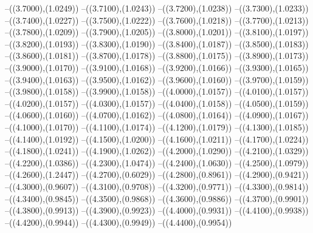 {	--({\sx*(3.7000)},{\sy*(1.0249)})
	--({\sx*(3.7100)},{\sy*(1.0243)})
	--({\sx*(3.7200)},{\sy*(1.0238)})
	--({\sx*(3.7300)},{\sy*(1.0233)})
	--({\sx*(3.7400)},{\sy*(1.0227)})
	--({\sx*(3.7500)},{\sy*(1.0222)})
	--({\sx*(3.7600)},{\sy*(1.0218)})
	--({\sx*(3.7700)},{\sy*(1.0213)})
	--({\sx*(3.7800)},{\sy*(1.0209)})
	--({\sx*(3.7900)},{\sy*(1.0205)})
	--({\sx*(3.8000)},{\sy*(1.0201)})
	--({\sx*(3.8100)},{\sy*(1.0197)})
	--({\sx*(3.8200)},{\sy*(1.0193)})
	--({\sx*(3.8300)},{\sy*(1.0190)})
	--({\sx*(3.8400)},{\sy*(1.0187)})
	--({\sx*(3.8500)},{\sy*(1.0183)})
	--({\sx*(3.8600)},{\sy*(1.0181)})
	--({\sx*(3.8700)},{\sy*(1.0178)})
	--({\sx*(3.8800)},{\sy*(1.0175)})
	--({\sx*(3.8900)},{\sy*(1.0173)})
	--({\sx*(3.9000)},{\sy*(1.0170)})
	--({\sx*(3.9100)},{\sy*(1.0168)})
	--({\sx*(3.9200)},{\sy*(1.0166)})
	--({\sx*(3.9300)},{\sy*(1.0165)})
	--({\sx*(3.9400)},{\sy*(1.0163)})
	--({\sx*(3.9500)},{\sy*(1.0162)})
	--({\sx*(3.9600)},{\sy*(1.0160)})
	--({\sx*(3.9700)},{\sy*(1.0159)})
	--({\sx*(3.9800)},{\sy*(1.0158)})
	--({\sx*(3.9900)},{\sy*(1.0158)})
	--({\sx*(4.0000)},{\sy*(1.0157)})
	--({\sx*(4.0100)},{\sy*(1.0157)})
	--({\sx*(4.0200)},{\sy*(1.0157)})
	--({\sx*(4.0300)},{\sy*(1.0157)})
	--({\sx*(4.0400)},{\sy*(1.0158)})
	--({\sx*(4.0500)},{\sy*(1.0159)})
	--({\sx*(4.0600)},{\sy*(1.0160)})
	--({\sx*(4.0700)},{\sy*(1.0162)})
	--({\sx*(4.0800)},{\sy*(1.0164)})
	--({\sx*(4.0900)},{\sy*(1.0167)})
	--({\sx*(4.1000)},{\sy*(1.0170)})
	--({\sx*(4.1100)},{\sy*(1.0174)})
	--({\sx*(4.1200)},{\sy*(1.0179)})
	--({\sx*(4.1300)},{\sy*(1.0185)})
	--({\sx*(4.1400)},{\sy*(1.0192)})
	--({\sx*(4.1500)},{\sy*(1.0200)})
	--({\sx*(4.1600)},{\sy*(1.0211)})
	--({\sx*(4.1700)},{\sy*(1.0224)})
	--({\sx*(4.1800)},{\sy*(1.0241)})
	--({\sx*(4.1900)},{\sy*(1.0262)})
	--({\sx*(4.2000)},{\sy*(1.0290)})
	--({\sx*(4.2100)},{\sy*(1.0329)})
	--({\sx*(4.2200)},{\sy*(1.0386)})
	--({\sx*(4.2300)},{\sy*(1.0474)})
	--({\sx*(4.2400)},{\sy*(1.0630)})
	--({\sx*(4.2500)},{\sy*(1.0979)})
	--({\sx*(4.2600)},{\sy*(1.2447)})
	--({\sx*(4.2700)},{\sy*(0.6029)})
	--({\sx*(4.2800)},{\sy*(0.8961)})
	--({\sx*(4.2900)},{\sy*(0.9421)})
	--({\sx*(4.3000)},{\sy*(0.9607)})
	--({\sx*(4.3100)},{\sy*(0.9708)})
	--({\sx*(4.3200)},{\sy*(0.9771)})
	--({\sx*(4.3300)},{\sy*(0.9814)})
	--({\sx*(4.3400)},{\sy*(0.9845)})
	--({\sx*(4.3500)},{\sy*(0.9868)})
	--({\sx*(4.3600)},{\sy*(0.9886)})
	--({\sx*(4.3700)},{\sy*(0.9901)})
	--({\sx*(4.3800)},{\sy*(0.9913)})
	--({\sx*(4.3900)},{\sy*(0.9923)})
	--({\sx*(4.4000)},{\sy*(0.9931)})
	--({\sx*(4.4100)},{\sy*(0.9938)})
	--({\sx*(4.4200)},{\sy*(0.9944)})
	--({\sx*(4.4300)},{\sy*(0.9949)})
	--({\sx*(4.4400)},{\sy*(0.9954)})
}
